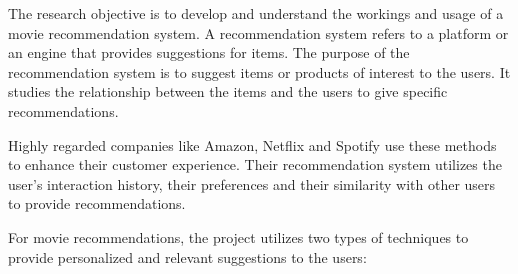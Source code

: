 \documentclass[a4paper,10pt]{article}
\begin{document}
The research objective is to develop and understand the workings and usage of a movie recommendation system. A recommendation system refers to a platform or an engine that provides suggestions for items. The purpose of the recommendation system is to suggest items or products of interest to the users. It studies the relationship between the items and the users to give specific recommendations.

    Highly regarded companies like Amazon, Netflix and Spotify use these methods to enhance their customer experience. Their recommendation system utilizes the user's interaction history, their preferences and their similarity with other users to provide recommendations.
    
    For movie recommendations, the project utilizes two types of techniques to provide personalized and relevant suggestions to the users:
\end{document}
